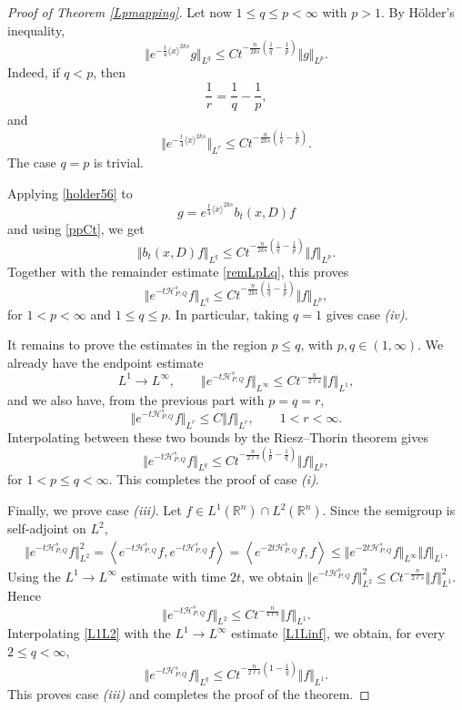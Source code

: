 \documentclass[12pt, reqno]{amsart}
\theoremstyle{definition}
\theoremstyle{remark}
\numberwithin{equation}{section}
\newcommand{\APQ}{\mathcal{H}_{P, Q}}
\begin{document}
\begin{proof}[Proof of Theorem \ref{Lpmapping}]
Let now $1\leq q\leq p<\infty$ with $p>1$. By H\"older's inequality,
\begin{equation}
\label{holder56}
    \Vert
    e^{-\frac{t}{4}\langle x\rangle^{2k s}}g
    \Vert_{L^q}
    \leq
    C t^{-\frac{n}{2k s}\left(\frac1q-\frac1p\right)}
    \Vert g\Vert_{L^p}.
\end{equation}
Indeed, if $q<p$, then
\[
    \frac1r=\frac1q-\frac1p,
\]
and
\[
    \Vert
    e^{-\frac{t}{4}\langle x\rangle^{2k s}}
    \Vert_{L^r}
    \leq
    C t^{-\frac{n}{2k s}\left(\frac1q-\frac1p\right)}.
\]
The case $q=p$ is trivial.

Applying \eqref{holder56} to
\[
    g=
    e^{\frac{t}{4}\langle x\rangle^{2k s}}
    b_t(x,D)f
\]
and using \eqref{ppCt}, we get
\[
    \Vert b_t(x,D)f\Vert_{L^q}
    \leq
    C
    t^{-\frac{n}{2k s}\left(\frac1q-\frac1p\right)}
    \Vert f\Vert_{L^p}.
\]
Together with the remainder estimate \eqref{remLpLq}, this proves
\[
    \Vert e^{-t\APQ^s}f\Vert_{L^q}
    \leq
    C
    t^{-\frac{n}{2k s}\left(\frac1q-\frac1p\right)}
    \Vert f\Vert_{L^p},
\]
for $1<p<\infty$ and $1\leq q\leq p$. In particular, taking $q=1$ gives case {\it (iv)}.

It remains to prove the estimates in the region $p\leq q$, with
$p,q\in(1,\infty)$. We already have the endpoint estimate
\[
    L^1\to L^\infty,
    \qquad
    \Vert e^{-t\APQ^s}f\Vert_{L^\infty}
    \leq
    C t^{-\frac{n}{2\ell s}}
    \Vert f\Vert_{L^1},
\]
and we also have, from the previous part with $p=q=r$,
\[
    \Vert e^{-t\APQ^s}f\Vert_{L^r}
    \leq
    C\Vert f\Vert_{L^r},
    \qquad 1<r<\infty.
\]
Interpolating between these two bounds by the Riesz--Thorin theorem gives
\[
    \Vert e^{-t\APQ^s}f\Vert_{L^q}
    \leq
    C
    t^{-\frac{n}{2\ell s}\left(\frac1p-\frac1q\right)}
    \Vert f\Vert_{L^p},
\]
for $1<p\leq q<\infty$. This completes the proof of case {\it (i)}.

Finally, we prove case {\it (iii)}. Let $f\in L^1(\mathbb R^n)\cap L^2(\mathbb R^n)$. Since the semigroup is self-adjoint on $L^2$,
\[
\begin{aligned}
    \Vert e^{-t\APQ^s}f\Vert_{L^2}^2
    =
    \left\langle
    e^{-t\APQ^s}f,
    e^{-t\APQ^s}f
    \right\rangle                         =
    \left\langle
    e^{-2t\APQ^s}f,
    f
    \right\rangle                         \leq
    \Vert e^{-2t\APQ^s}f\Vert_{L^\infty}
    \Vert f\Vert_{L^1}.
\end{aligned}
\]
Using the $L^1\to L^\infty$ estimate with time $2t$, we obtain $\Vert e^{-t\APQ^s}f\Vert_{L^2}^2
    \leq
    C t^{-\frac{n}{2\ell s}}
    \Vert f\Vert_{L^1}^2.$
Hence
\begin{equation}
\label{L1L2}
    \Vert e^{-t\APQ^s}f\Vert_{L^2}
    \leq
    C t^{-\frac{n}{4\ell s}}
    \Vert f\Vert_{L^1}.
\end{equation}
Interpolating \eqref{L1L2} with the $L^1\to L^\infty$ estimate
\eqref{L1Linf}, we obtain, for every $2\leq q<\infty$,
\[
    \Vert e^{-t\APQ^s}f\Vert_{L^q}
    \leq
    C
    t^{-\frac{n}{2\ell s}\left(1-\frac1q\right)}
    \Vert f\Vert_{L^1}.
\]
This proves case {\it (iii)} and completes the proof of the theorem.
\end{proof}
\end{document}
